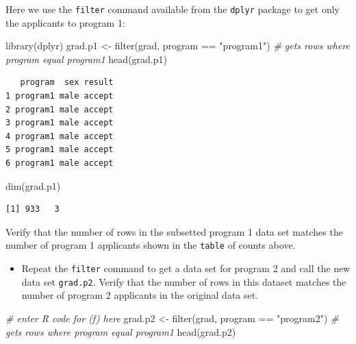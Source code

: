 \documentclass[
]{book}
\newenvironment{Shaded}{\begin{snugshade}}{\end{snugshade}}
\newcommand{\CommentTok}[1]{\textcolor[rgb]{0.56,0.35,0.01}{\textit{#1}}}
\newcommand{\FunctionTok}[1]{\textcolor[rgb]{0.00,0.00,0.00}{#1}}
\newcommand{\NormalTok}[1]{#1}
\newcommand{\OtherTok}[1]{\textcolor[rgb]{0.56,0.35,0.01}{#1}}
\newcommand{\SpecialCharTok}[1]{\textcolor[rgb]{0.00,0.00,0.00}{#1}}
\newcommand{\StringTok}[1]{\textcolor[rgb]{0.31,0.60,0.02}{#1}}
\providecommand{\tightlist}{%
  \setlength{\itemsep}{0pt}\setlength{\parskip}{0pt}}
\begin{document}
Here we use the \texttt{filter} command available from the \texttt{dplyr} package to get only the applicants to program 1:

\begin{Shaded}
\begin{Highlighting}[]
\FunctionTok{library}\NormalTok{(dplyr)}
\NormalTok{grad.p1 }\OtherTok{\textless{}{-}} \FunctionTok{filter}\NormalTok{(grad, program }\SpecialCharTok{==} \StringTok{"program1"}\NormalTok{)  }\CommentTok{\# gets rows where program equal program1}
\FunctionTok{head}\NormalTok{(grad.p1)}
\end{Highlighting}
\end{Shaded}

\begin{verbatim}
   program  sex result
1 program1 male accept
2 program1 male accept
3 program1 male accept
4 program1 male accept
5 program1 male accept
6 program1 male accept
\end{verbatim}

\begin{Shaded}
\begin{Highlighting}[]
\FunctionTok{dim}\NormalTok{(grad.p1)}
\end{Highlighting}
\end{Shaded}

\begin{verbatim}
[1] 933   3
\end{verbatim}

Verify that the number of rows in the subsetted program 1 data set matches the number of program 1 applicants shown in the \texttt{table} of counts above.

\begin{itemize}
\tightlist
\item
  Repeat the \texttt{filter} command to get a data set for program 2 and call the new data set \texttt{grad.p2}. Verify that the number of rows in this dataset matches the number of program 2 applicants in the original data set.
\end{itemize}

\begin{Shaded}
\begin{Highlighting}[]
\CommentTok{\# enter R code for (f) here}
\NormalTok{grad.p2 }\OtherTok{\textless{}{-}} \FunctionTok{filter}\NormalTok{(grad, program }\SpecialCharTok{==} \StringTok{"program2"}\NormalTok{) }\CommentTok{\# gets rows where program equal program1}
\FunctionTok{head}\NormalTok{(grad.p2)}
\end{Highlighting}
\end{Shaded}
\end{document}
